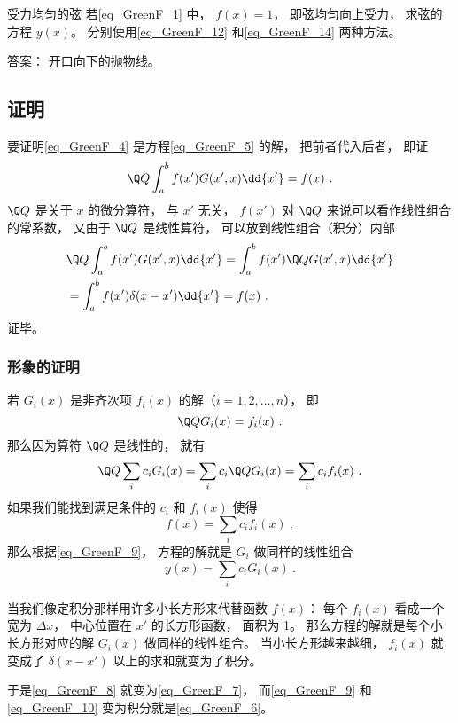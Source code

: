 \begin{exercise}{受力均匀的弦}
若\autoref{eq_GreenF_1} 中， $f(x) = 1$， 即弦均匀向上受力， 求弦的方程 $y(x)$。 分别使用\autoref{eq_GreenF_12} 和\autoref{eq_GreenF_14} 两种方法。

答案： 开口向下的抛物线。
\end{exercise}

\subsection{证明}
要证明\autoref{eq_GreenF_4} 是方程\autoref{eq_GreenF_5} 的解， 把前者代入后者， 即证
\begin{equation}
\Q Q \int_a^b f(x') G(x', x) \dd{x'} = f(x)~.
\end{equation}
$\Q Q$ 是关于 $x$ 的微分算符， 与 $x'$ 无关， $f(x')$ 对 $\Q Q$ 来说可以看作线性组合的常系数， 又由于 $\Q Q$ 是线性算符， 可以放到线性组合（积分）内部
\begin{equation}\label{eq_GreenF_6}
\begin{aligned}
&\Q Q \int_a^b f(x') G(x', x) \dd{x'} = \int_a^b f(x') \Q QG(x', x)\dd{x'}\\
&= \int_a^b f(x') \delta(x - x') \dd{x'} = f(x)~.
\end{aligned}
\end{equation}
证毕。

\subsubsection{形象的证明}
若 $G_i(x)$ 是非齐次项 $f_i(x)$ 的解（$i = 1,2,\dots, n$）， 即
\begin{equation}\label{eq_GreenF_8}
\Q Q G_i(x) = f_i(x)~.
\end{equation}
那么因为算符 $\Q Q$ 是线性的， 就有
\begin{equation}\label{eq_GreenF_9}
\Q Q\sum_i c_i G_i(x) = \sum_i c_i \Q Q G_i(x) = \sum_i c_i f_i(x)~.
\end{equation}
如果我们能找到满足条件的 $c_i$ 和 $f_i(x)$ 使得
\begin{equation}\label{eq_GreenF_10}
f(x) = \sum_i c_i f_i(x)~,
\end{equation}
那么根据\autoref{eq_GreenF_9}， 方程的解就是 $G_i$ 做同样的线性组合
\begin{equation}
y(x) = \sum_i c_i G_i(x)~.
\end{equation}

当我们像定积分那样用许多小长方形来代替函数 $f(x)$： 每个 $f_i(x)$ 看成一个宽为 $\Delta x$， 中心位置在 $x'$ 的长方形函数， 面积为 1。 那么方程的解就是每个小长方形对应的解 $G_i(x)$ 做同样的线性组合。 当小长方形越来越细， $f_i(x)$ 就变成了 $\delta(x - x')$ 以上的求和就变为了积分。

于是\autoref{eq_GreenF_8} 就变为\autoref{eq_GreenF_7}， 而\autoref{eq_GreenF_9} 和\autoref{eq_GreenF_10} 变为积分就是\autoref{eq_GreenF_6}。 
